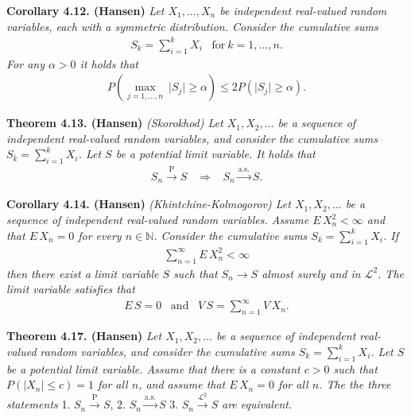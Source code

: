\documentclass[a4paper,12pt,openany]{book}
\begin{document}
\textbf{Corollary 4.12. (Hansen)} \emph{Let \(X_1,...,X_n\) be independent real-valued random variables, each with a symmetric distribution. Consider the cumulative sums}
\begin{align*}
    S_k=\sum_{i=1}^kX_i\hspace{10pt}\text{for}\ k=1,..., n.
\end{align*}
\emph{For any \(\alpha>0\) it holds that}
\begin{align*}
    P\left(\max_{j=1,...,n}\ \vert S_j\vert\ge \alpha\right)\le 2 P(\vert S_j\vert\ge \alpha).\tag{4.14}
\end{align*}

\textbf{Theorem 4.13. (Hansen)} \emph{(Skorokhod) Let \(X_1,X_2,...\) be a sequence of independent real-valued random variables, and consider the cumulative sums \(S_k=\sum_{i=1}^kX_i\). Let \(S\) be a potential limit variable. It holds that}
\begin{align*}
    S_n \stackrel{\text{P}}{\to} S\hspace{10pt}\Rightarrow\hspace{10pt} S_n\stackrel{\text{a.s.}}{\to} S.
\end{align*}

\textbf{Corollary 4.14. (Hansen)} \emph{(Khintchine-Kolmogorov) Let \(X_1,X_2,...\) be a sequence of independent real-valued random variables. Assume \(E\, X_n^2<\infty\) and that \(E\, X_n=0\) for every \(n\in\mathbb{N}\). Consider the cumulative sums \(S_k=\sum_{i=1}^kX_i\). If}
\begin{align*}
    \sum_{n=1}^\infty E\, X_n^2<\infty\tag{4.18}
\end{align*}
\emph{then there exist a limit variable \(S\) such that \(S_n\to S\) almost surely and in \(\mathcal{L}^2\). The limit variable satisfies that}
\begin{align*}
    E\, S=0\hspace{10pt}\text{and}\hspace{10pt}V\, S=\sum_{n=1}^\infty V\, X_n.
\end{align*}

\textbf{Theorem 4.17. (Hansen)} \emph{Let \(X_1,X_2,...\) be a sequence of independent real-valued random variables, and consider the cumulative sums \(S_k=\sum_{i=1}^kX_i\). Let \(S\) be a potential limit variable. Assume that there is a constant \(c>0\) such that \(P(\vert X_n\vert \le c)=1\) for all \(n\), and assume that \(E\, X_n=0\) for all \(n\). The the three statements}
1. \(S_n\stackrel{\text{P}}{\to} S\),
2. \(S_n\stackrel{\text{a.s.}}{\to} S\)
3. \(S_n\stackrel{\mathcal{L}^2}{\to} S\)
\emph{are equivalent.}
\end{document}

